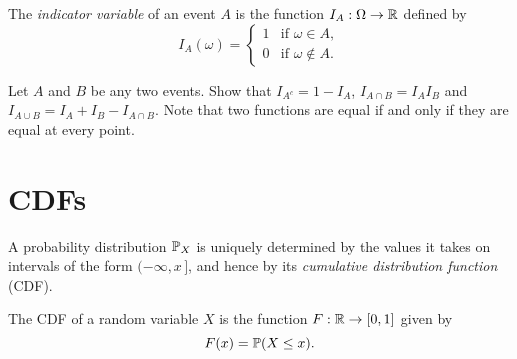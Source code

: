 \begin{definition}\label{def:indicator}
The \emph{indicator variable} of an event $A$ is the function $I_A:\Omega\to\mathbb{R}$ defined by
\[
I_A(\omega) =
  \begin{cases}
   1 & \text{if } \omega\in A, \\
   0 & \text{if } \omega\notin A.
  \end{cases}
\]
\end{definition}

\begin{exercise}
Let $A$ and $B$ be any two events. Show that $I_{A^c} = 1 - I_A$, $I_{A\cap B} = I_A I_B$ and $I_{A\cup B} = I_A + I_B - I_{A\cap B}$. Note that two functions are equal if and only if they are equal at every point.
\end{exercise}


\section{CDFs}\label{sec:cdfs}

A probability distribution $\mathbb{P}_X$ is uniquely determined by the values it takes on intervals of the form $(-\infty, x\,]$, and hence by its \emph{cumulative distribution function} (CDF).


\begin{definition}
The CDF of a random variable $X$ is the function $F:\mathbb{R}\to[0,1]$ given by
\[
F(x) =  \mathbb{P}(X\leq x).
\]
\end{definition}



